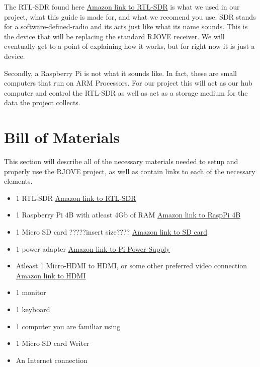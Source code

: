 \documentclass[letterpaper,12pt,notitlepage]{report} %
\begin{document}
The RTL-SDR found here \href{https://www.amazon.com/RTL-SDR-Blog-RTL2832U-Software-Defined/dp/B0129EBDS2}{Amazon link to RTL-SDR} is what we used in our project, what this guide is made for, and what we recomend you use. SDR stands for a software-defined-radio and its acts just like what its name sounds. This is the device that will be replacing the standard RJOVE receiver. We will eventually get to a point of explaining how it works, but for right now it is just a device.

Secondly, a Raspberry Pi is not what it sounds like. In fact, these are small computers that run on ARM Processors. For our project this will act as our hub computer and control the RTL-SDR as well as act as a storage medium for the data the project collects.

\section{Bill of Materials}
This section will describe all of the necessary materials needed to setup and properly use the RJOVE project, as well as contain links to each of the necessary elements.
\begin{itemize}
	\item 1 RTL-SDR \href{https://www.amazon.com/RTL-SDR-Blog-RTL2832U-Software-Defined/dp/B0129EBDS2}{Amazon link to RTL-SDR}
	\item 1 Raspberry Pi 4B with atleast 4Gb of RAM \href{https://www.amazon.com/Raspberry-Model-2019-Quad-Bluetooth/dp/B07TC2BK1X/ref=sr_1_3?dchild=1&keywords=raspberry+pi+4&qid=1616547693&sr=8-3}{Amazon link to RaspPi 4B}
	\item 1 Micro SD card ?????insert size???? \href{https://www.amazon.com/Silicon-Power-Superior-MicroSD-Adapter/dp/B07S5QW5V3/ref=sr_1_23?_encoding=UTF8&c=ts&dchild=1&keywords=Micro+SD+Memory+Cards&qid=1616547894&s=pc&sr=1-23&ts_id=3015433011}{Amazon link to SD card}
	\item 1 power adapter \href{https://www.amazon.com/CanaKit-Raspberry-Power-Supply-USB-C/dp/B07TYQRXTK/ref=sr_1_4?dchild=1&keywords=raspberry+pi+4+charger&qid=1616547982&s=electronics&sr=1-4}{Amazon link to Pi Power Supply}
	\item Atleast 1 Micro-HDMI to HDMI, or some other preferred video connection \href{https://www.amazon.com/UGREEN-Adapter-Ethernet-Compatible-Raspberry/dp/B06WWQ7KLV/ref=sr_1_3?dchild=1&keywords=micro+hdmi&qid=1616548064&s=electronics&sr=1-3}{Amazon link to HDMI}
	\item 1 monitor
	\item 1 keyboard
	\item 1 computer you are familiar using
	\item 1 Micro SD card Writer
	\item An Internet connection
\end{itemize}
\end{document}
